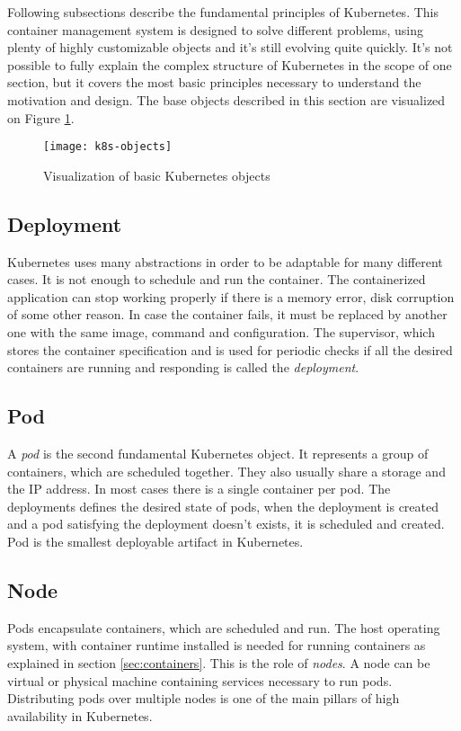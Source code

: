 \documentclass[
  digital, %
  twoside, %
  table,   %
  lof,     %
  lot,     %
]{fithesis3}
\begin{document}
Following subsections describe the fundamental principles of Kubernetes. This container management system is designed to solve different problems, using plenty of highly customizable objects and it's still evolving quite quickly. It's not possible to fully explain the complex structure of Kubernetes in the scope of one section, but it covers the most basic principles necessary to understand the motivation and design. The base objects described in this section are visualized on Figure \ref{fig:k8s-objects}.

\begin{figure}[H]
\caption{Visualization of basic Kubernetes objects}
\centering
\texttt{[image: k8s-objects]}
\label{fig:k8s-objects}
\end{figure}

\subsection{Deployment} \label{sec:deployment}
Kubernetes uses many abstractions in order to be adaptable for many different cases. It is not enough to schedule and run the container. The containerized application can stop working properly if there is a memory error, disk corruption of some other reason. In case the container fails, it must be replaced by another one with the same image, command and configuration. The supervisor, which stores the container specification and is used for periodic checks if all the desired containers are running and responding is called the \textit{deployment}.

\subsection{Pod} \label{sec:pod}
A \textit{pod} is the second fundamental Kubernetes object. It represents a group of containers, which are scheduled together. They also usually share a storage and the IP address. In most cases there is a single container per pod. The deployments defines the desired state of pods, when the deployment is created and a pod satisfying the deployment doesn't exists, it is scheduled and created. Pod is the smallest deployable artifact in Kubernetes.

\subsection{Node} \label{sec:node}
Pods encapsulate containers, which are scheduled and run. The host operating system, with container runtime installed is needed for running containers as explained in section \ref{sec:containers}. This is the role of \textit{nodes}. A node can be virtual or physical machine containing services necessary to run pods. Distributing pods over multiple nodes is one of the main pillars of high availability in Kubernetes.
\end{document}
